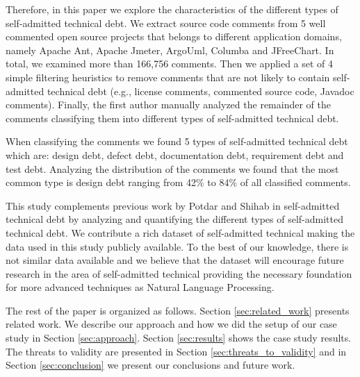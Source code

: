
Therefore, in this paper we explore the characteristics of the different types of self-admitted technical debt. We extract source code comments from 5 well commented open source projects that belongs to different application domains, namely Apache Ant, Apache Jmeter, ArgoUml, Columba and JFreeChart. In total, we examined more than 166,756 comments. Then we applied a set of 4 simple filtering heuristics to remove comments that are not likely to contain self-admitted technical debt (e.g., license comments, commented source code, Javadoc comments). Finally, the first author manually analyzed the remainder of the comments classifying them into different types of self-admitted technical debt. 

When classifying the comments we found 5 types of self-admitted technical debt which are: design debt, defect debt, documentation debt, requirement debt and test debt. Analyzing the distribution of the comments we found that the most common type is design debt ranging from 42\% to 84\% of all classified comments. 

This study complements previous work by Potdar and Shihab \cite{Potdar2014ICSME} in self-admitted technical debt by analyzing and quantifying the different types of self-admitted technical debt. We contribute a rich dataset of self-admitted technical making the data used in this study publicly available. To the best of our knowledge, there is not similar data available and we believe that the dataset will encourage future research in the area of self-admitted technical providing the necessary foundation for more advanced techniques as Natural Language Processing.  

The rest of the paper is organized as follows. Section \ref{sec:related_work} presents related work. We describe our approach and how we did the setup of our case study in Section \ref{sec:approach}. Section \ref{sec:results} shows the case study results. The threats to validity are presented in Section \ref{sec:threats_to_validity} and in Section \ref{sec:conclusion} we present our conclusions and future work. 